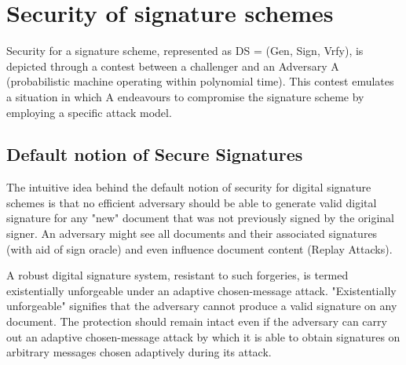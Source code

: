 \documentclass[]{final_report}
\theoremstyle{definition}
\begin{document}
\section{Security of signature schemes}
Security for a signature scheme, represented as DS = (Gen, Sign, Vrfy), is depicted through a contest between a challenger and an Adversary A (probabilistic machine operating within polynomial time). This contest emulates a situation in which A endeavours to compromise the signature scheme by employing a specific attack model. 

\subsection{Default notion of Secure Signatures}
The intuitive idea behind the default notion of security for digital signature schemes is that no efficient adversary should be able to generate valid digital signature for any "new" document that was not previously signed by the original signer.
An adversary might see all documents and their associated signatures (with aid of sign oracle) and even influence document content (Replay Attacks).

A robust digital signature system, resistant to such forgeries, is termed existentially unforgeable under an adaptive chosen-message attack. "Existentially unforgeable" signifies that the adversary cannot produce a valid signature on any document. The protection should remain intact even if the adversary can carry out an adaptive chosen-message attack by which it is able to obtain signatures on arbitrary messages chosen adaptively during its attack.
\end{document}
